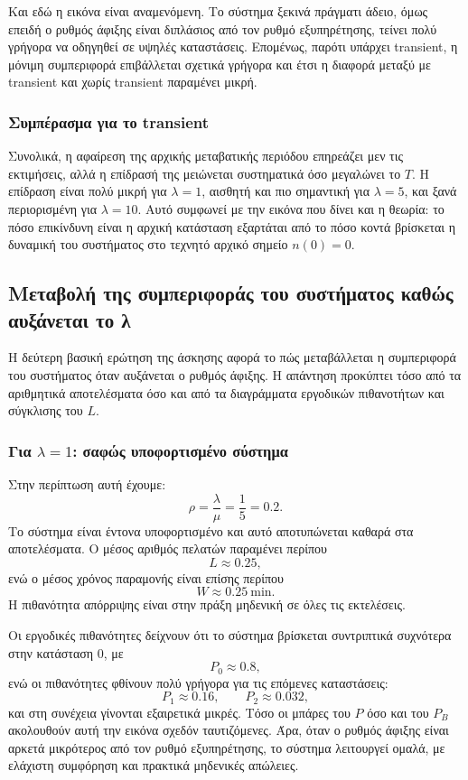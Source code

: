 \documentclass{article}
\begin{document}
Και εδώ η εικόνα είναι αναμενόμενη. Το σύστημα ξεκινά πράγματι άδειο, όμως επειδή ο ρυθμός άφιξης είναι διπλάσιος από τον ρυθμό εξυπηρέτησης, τείνει πολύ γρήγορα να οδηγηθεί σε υψηλές καταστάσεις. Επομένως, παρότι υπάρχει transient, η μόνιμη συμπεριφορά επιβάλλεται σχετικά γρήγορα και έτσι η διαφορά μεταξύ με transient και χωρίς transient παραμένει μικρή.

\subsubsection*{Συμπέρασμα για το transient}

Συνολικά, η αφαίρεση της αρχικής μεταβατικής περιόδου επηρεάζει μεν τις εκτιμήσεις, αλλά η επίδρασή της μειώνεται συστηματικά όσο μεγαλώνει το $T$. Η επίδραση είναι πολύ μικρή για $\lambda=1$, αισθητή και πιο σημαντική για $\lambda=5$, και ξανά περιορισμένη για $\lambda=10$. Αυτό συμφωνεί με την εικόνα που δίνει και η θεωρία: το πόσο επικίνδυνη είναι η αρχική κατάσταση εξαρτάται από το πόσο κοντά βρίσκεται η δυναμική του συστήματος στο τεχνητό αρχικό σημείο $n(0)=0$.

\subsection{Μεταβολή της συμπεριφοράς του συστήματος καθώς αυξάνεται το λ}

Η δεύτερη βασική ερώτηση της άσκησης αφορά το πώς μεταβάλλεται η συμπεριφορά του συστήματος όταν αυξάνεται ο ρυθμός άφιξης. Η απάντηση προκύπτει τόσο από τα αριθμητικά αποτελέσματα όσο και από τα διαγράμματα εργοδικών πιθανοτήτων και σύγκλισης του $L$.

\subsubsection*{Για $\lambda=1$: σαφώς υποφορτισμένο σύστημα}

Στην περίπτωση αυτή έχουμε:
\[
\rho=\frac{\lambda}{\mu}=\frac{1}{5}=0.2.
\]
Το σύστημα είναι έντονα υποφορτισμένο και αυτό αποτυπώνεται καθαρά στα αποτελέσματα. Ο μέσος αριθμός πελατών παραμένει περίπου
\[
L \approx 0.25,
\]
ενώ ο μέσος χρόνος παραμονής είναι επίσης περίπου
\[
W \approx 0.25 \ \text{min}.
\]
Η πιθανότητα απόρριψης είναι στην πράξη μηδενική σε όλες τις εκτελέσεις.

Οι εργοδικές πιθανότητες δείχνουν ότι το σύστημα βρίσκεται συντριπτικά συχνότερα στην κατάσταση $0$, με
\[
P_0 \approx 0.8,
\]
ενώ οι πιθανότητες φθίνουν πολύ γρήγορα για τις επόμενες καταστάσεις:
\[
P_1 \approx 0.16,\qquad P_2 \approx 0.032,
\]
και στη συνέχεια γίνονται εξαιρετικά μικρές. Τόσο οι μπάρες του $P$ όσο και του $P_B$ ακολουθούν αυτή την εικόνα σχεδόν ταυτιζόμενες. Άρα, όταν ο ρυθμός άφιξης είναι αρκετά μικρότερος από τον ρυθμό εξυπηρέτησης, το σύστημα λειτουργεί ομαλά, με ελάχιστη συμφόρηση και πρακτικά μηδενικές απώλειες.
\end{document}
